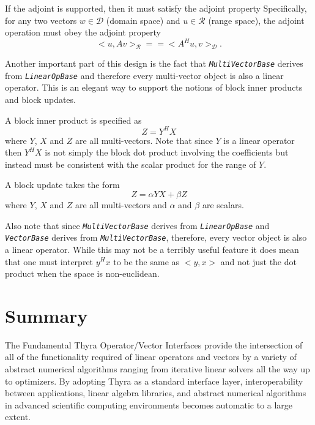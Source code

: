 \documentclass[pdf,ps2pdf,11pt]{SANDreport}
\begin{document}
If the adjoint is supported, then it must satisfy the adjoint property
Specifically, for any two vectors $w\in\mathcal{D}$ (domain space) and
$u\in\mathcal{R}$ (range space), the adjoint operation must obey the adjoint
property
\[
  <u,A v>_{\mathcal{R}} =\!= <A^H u, v>_{\mathcal{D}}.
\]


Another important part of this design is the fact that
{}\texttt{\textit{Multi\-Vector\-Base}} derives from
{}\texttt{\textit{Linear\-Op\-Base}} and therefore every multi-vector object
is also a linear operator.  This is an elegant way to support the notions of
block inner products and block updates.

A block inner product is specified as
\[
Z = Y^H X
\]
where $Y$, $X$ and $Z$ are all multi-vectors.  Note that since $Y$ is a linear
operator then $Y^H X$ is not simply the block dot product involving the
coefficients but instead must be consistent with the scalar product for the
range of $Y$.

A block update takes the form
\[
Z =\alpha Y X + \beta Z
\]
where $Y$, $X$ and $Z$ are all multi-vectors and $\alpha$ and $\beta$ are
scalars.

Also note that since {}\texttt{\textit{Multi\-Vector\-Base}} derives from
{}\texttt{\textit{Linear\-Op\-Base}} and {}\texttt{\textit{Vector\-Base}}
derives from {}\texttt{\textit{Multi\-Vector\-Base}}, therefore, every vector
object is also a linear operator.  While this may not be a terribly useful
feature it does mean that one must interpret $y^H x$ to be the same as $<y,x>$
and not just the dot product when the space is non-euclidean.

%
\section{Summary}
%

The Fundamental Thyra Operator/Vector Interfaces provide the intersection of
all of the functionality required of linear operators and vectors by a variety
of abstract numerical algorithms ranging from iterative linear solvers all the
way up to optimizers.  By adopting Thyra as a standard interface layer,
interoperability between applications, linear algebra libraries, and abstract
numerical algorithms in advanced scientific computing environments becomes
automatic to a large extent.

%
\clearpage



%
\appendix
%

\end{document}
